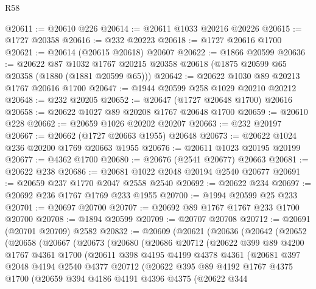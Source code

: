\begin{lexlean}{R58}
\begin{coremodule}
@20611 := @20610 @226
@20614 := @20611 @1033 @20216 @20226
@20615 := @1727 @20358
@20616 := @232 @20223
@20618 := @1727 @20616 @1700
@20621 := @20614 (@20615 @20618) @20607
@20622 := @1866 @20599
@20636 := @20622
    @87
    @1032
    @1767
    @20215
    @20358
    @20618
    (@1875 @20599 @65 @20358 (@1880 (@1881 @20599 @65)))
@20642 := @20622 @1030 @89 @20213 @1767 @20616 @1700
@20647 := @1944 @20599 @258 @1029 @20210 @20212
@20648 := @232 @20205
@20652 := @20647 (@1727 @20648 @1700) @20616
@20658 := @20622 @1027 @89 @20208 @1767 @20648 @1700
@20659 := @20610 @228
@20662 := @20659 @1026 @20202 @20207
@20663 := @232 @20197
@20667 := @20662 (@1727 @20663 @1955) @20648
@20673 := @20622 @1024 @236 @20200 @1769 @20663 @1955
@20676 := @20611 @1023 @20195 @20199
@20677 := @4362 @1700
@20680 := @20676 (@2541 @20677) @20663
@20681 := @20622 @238
@20686 := @20681 @1022 @2048 @20194 @2540 @20677
@20691 := @20659 @237 @1770 @2047 @2558 @2540
@20692 := @20622 @234
@20697 := @20692 @236 @1767 @1769 @233 @1955
@20700 := @1994 @20599 @25 @233
@20701 := @20697 @20700
@20707 := @20692 @89 @1767 @1767 @233 @1700 @20700
@20708 := @1894 @20599
@20709 := @20707 @20708
@20712 := @20691 (@20701 @20709) @2582
@20832 := @20609
    (@20621
      (@20636
        (@20642
          (@20652
            (@20658
              (@20667
                (@20673
                  (@20680
                    (@20686
                      @20712
                      (@20622
                        @399
                        @89
                        @4200
                        @1767
                        @4361
                        @1700
                        (@20611
                          @398
                          @4195
                          @4199
                          @4378
                          @4361
                          (@20681
                            @397
                            @2048
                            @4194
                            @2540
                            @4377
                            @20712
                            (@20622
                              @395
                              @89
                              @4192
                              @1767
                              @4375
                              @1700
                              (@20659
                                @394
                                @4186
                                @4191
                                @4396
                                @4375
                                (@20622
                                  @344

\end{coremodule}
\end{lexlean}
